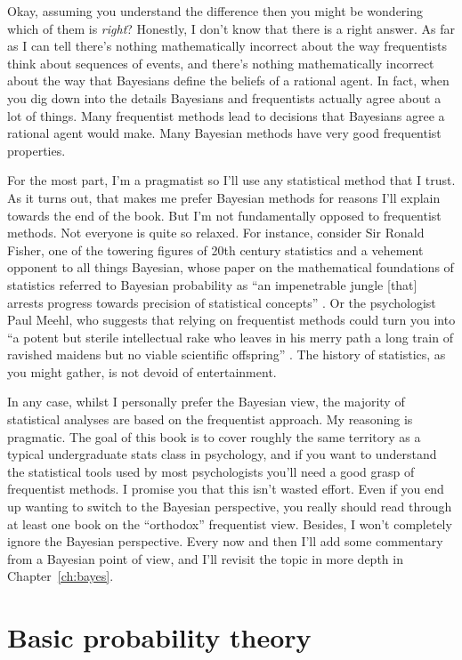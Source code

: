 Okay, assuming you understand the difference then you might be wondering which of them is {\it right}? Honestly, I don't know that there is a right answer. As far as I can tell there's nothing mathematically incorrect about the way frequentists think about sequences of events, and there's nothing mathematically incorrect about the way that Bayesians define the beliefs of a rational agent. In fact, when you dig down into the details Bayesians and frequentists actually agree about a lot of things. Many frequentist methods lead to decisions that Bayesians agree a rational agent would make. Many Bayesian methods have very good frequentist properties. 

For the most part, I'm a pragmatist so I'll use any statistical method that I trust. As it turns out, that makes me prefer Bayesian methods for reasons I'll explain towards the end of the book. But I'm not fundamentally opposed to frequentist methods. Not everyone is quite so relaxed. For instance, consider Sir Ronald Fisher, one of the towering figures of 20th century statistics and a vehement opponent to all things Bayesian, whose paper on the mathematical foundations of statistics referred to Bayesian probability as ``an impenetrable jungle [that] arrests progress towards precision of statistical concepts'' \parencite[p. 311]{Fisher1922b}. Or the psychologist Paul Meehl, who suggests that relying on frequentist methods could turn you into ``a potent but sterile intellectual rake who leaves in his merry path a long train of ravished maidens but no viable scientific offspring'' \parencite[p. 114]{Meehl1967}. The history of statistics, as you might gather, is not devoid of entertainment.

In any case, whilst I personally prefer the Bayesian view, the majority of statistical analyses are based on the frequentist approach. My reasoning is pragmatic. The goal of this book is to cover roughly the same territory as a typical undergraduate stats class in psychology, and if you want to understand the statistical tools used by most psychologists you'll need a good grasp of frequentist methods. I promise you that this isn't wasted effort. Even if you end up wanting to switch to the Bayesian perspective, you really should read through at least one book on the ``orthodox'' frequentist view. Besides, I won't completely ignore the Bayesian perspective. Every now and then I'll add some commentary from a Bayesian point of view, and I'll revisit the topic in more depth in Chapter~\ref{ch:bayes}.

 
\section{Basic probability theory~\label{sec:basicprobability}}

